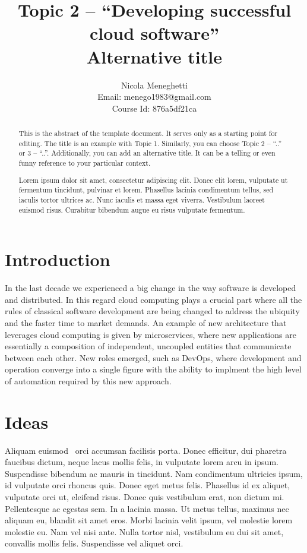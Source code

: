 \documentclass[a4paper, 10pt, conference]{ieeeconf}
\title{Topic 2 -- ``Developing successful cloud software'' \\
\large{Alternative title}} %
\author{Nicola Meneghetti \\
	Email: menego1983@gmail.com \\
	Course Id: 876a5df21ca
}
\begin{document}
\maketitle
\thispagestyle{empty}
\pagestyle{empty}

\begin{abstract}

This is the abstract of the template document. It serves only as a starting point for editing. The title is an example with Topic 1. Similarly, you can choose Topic 2 -- ``..'' or 3 -- ``..''. Additionally, you can add an alternative title. It can be a telling or even funny reference to your particular context.

Lorem ipsum dolor sit amet, consectetur adipiscing elit. Donec elit lorem, vulputate ut fermentum tincidunt, pulvinar et lorem. Phasellus lacinia condimentum tellus, sed iaculis tortor ultrices ac. Nunc iaculis et massa eget viverra. Vestibulum laoreet euismod risus. Curabitur bibendum augue eu risus vulputate fermentum.

\end{abstract}

\section{Introduction}

In the last decade we experienced a big change in the way software is developed and distributed. In this regard cloud computing plays a crucial part where all the rules of classical software development are being changed to address the ubiquity and the faster time to market demands. An example of new architecture that leverages cloud computing is given by microservices, where new applications are essentially a composition of independent, uncoupled entities that communicate between each other. New roles emerged, such as DevOps, where development and operation converge into a single figure with the ability to implment the high level of automation required by this new approach. 




\section{Ideas}

Aliquam euismod~\cite{fuggetta2014software} orci accumsan facilisis porta. Donec efficitur, dui pharetra faucibus dictum, neque lacus mollis felis, in vulputate lorem arcu in ipsum. Suspendisse bibendum ac mauris in tincidunt. Nam condimentum ultricies ipsum, id vulputate orci rhoncus quis. Donec eget metus felis. Phasellus id ex aliquet, vulputate orci ut, eleifend risus. Donec quis vestibulum erat, non dictum mi. Pellentesque ac egestas sem. In a lacinia massa. Ut metus tellus, maximus nec aliquam eu, blandit sit amet eros. Morbi lacinia velit ipsum, vel molestie lorem molestie eu. Nam vel nisi ante. Nulla tortor nisl, vestibulum eu dui sit amet, convallis mollis felis. Suspendisse vel aliquet orci.



\end{document}
